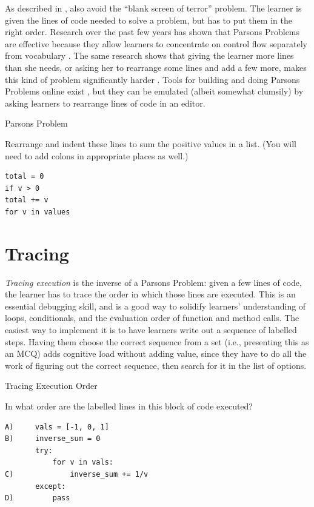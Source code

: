 As described in ,  also avoid the ``blank screen of terror'' problem.  The
learner is given the lines of code needed to solve a problem, but has
to put them in the right order. Research over the past few years has
shown that Parsons Problems are effective because they allow learners
to concentrate on control flow separately from vocabulary
\cite{Pars2006,Eric2015,Morr2016,Eric2017}. The same research shows
that giving the learner more lines than she needs, or asking her to
rearrange some lines and add a few more, makes this kind of problem
significantly harder \cite{Harm2016}.  Tools for building and doing
Parsons Problems online exist \cite{Ihan2011}, but they can be
emulated (albeit somewhat clumsily) by asking learners to rearrange
lines of code in an editor.

\begin{callout}{Parsons Problem}

  Rearrange and indent these lines to sum the positive values in a
  list.  (You will need to add colons in appropriate places as well.)

\begin{verbatim}
total = 0
if v > 0
total += v
for v in values
\end{verbatim}

\end{callout}

\section{Tracing}\label{s:exercises-tracing}

\emph{Tracing execution} is the inverse of a Parsons Problem: given a
few lines of code, the learner has to trace the order in which those
lines are executed. This is an essential debugging skill, and is a
good way to solidify learners' understanding of loops, conditionals,
and the evaluation order of function and method calls. The easiest way
to implement it is to have learners write out a sequence of labelled
steps.  Having them choose the correct sequence from a set (i.e.,
presenting this as an MCQ) adds cognitive load without adding value,
since they have to do all the work of figuring out the correct
sequence, then search for it in the list of options.

\begin{callout}{Tracing Execution Order}

  In what order are the labelled lines in this block of code executed?

\begin{verbatim}
A)     vals = [-1, 0, 1]
B)     inverse_sum = 0
       try:
           for v in vals:
C)             inverse_sum += 1/v
       except:
D)         pass
\end{verbatim}

\end{callout}

